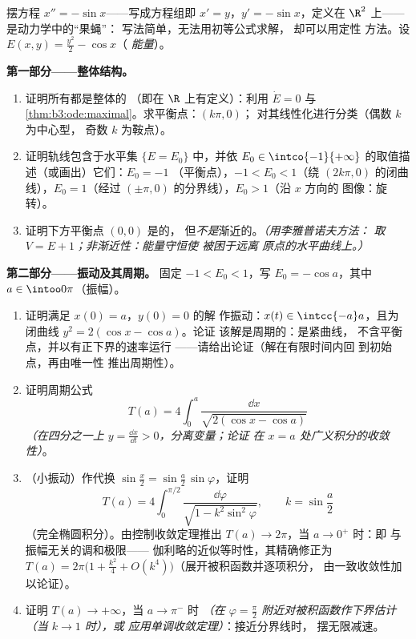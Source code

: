 \begin{problem}\label{pb:b3:ode:1}
摆方程 $x'' = -\sin x$——写成方程组即 $x' =
y$，$y' = -\sin x$，定义在 $\R^2$ 上——是动力学中的“果蝇”：
写法简单，无法用初等公式求解，
却可以用定性
方法。设 $E(x, y) = \frac{y^2}2 - \cos x$（
\emph{能量}）。

\medskip
\noindent\textbf{第一部分——整体结构。}
\begin{enumerate}
  \item 证明所有都是整体的
        （即在 $\R$ 上有定义）：利用 $\dot E = 0$ 与
        \cref{thm:b3:ode:maximal}。求平衡点：$(k\pi, 0)$；
        对其线性化进行分类（偶数 $k$ 为中心型，
        奇数 $k$ 为鞍点）。
  \item 证明轨线包含于水平集
        $\{E = E_0\}$ 中，并依
        $E_0 \in \intco{-1}{+\infty}$ 的取值描述（或画出）它们：$E_0 = -1$
        （平衡点），$-1 < E_0 < 1$（绕
        $(2k\pi, 0)$ 的闭曲线），$E_0 = 1$（经过
        $(\pm\pi, 0)$ 的分界线），$E_0 > 1$（沿 $x$ 方向的
        图像：旋转）。
  \item 证明下方平衡点 $(0,0)$ 是的，
        但\emph{不是}渐近的。\emph{（用李雅普诺夫方法：
        取 $V = E + 1$；非渐近性：能量守恒使
        被困于远离
        原点的水平曲线上。）}
\end{enumerate}

\medskip
\noindent\textbf{第二部分——振动及其周期。}
固定 $-1 < E_0 < 1$，写 $E_0 = -\cos a$，其中 $a \in
\intoo0\pi$（振幅）。
\begin{enumerate}[resume]
  \item 证明满足 $x(0) = a$，$y(0) = 0$ 的解
        作振动：$x(t) \in \intcc{-a}a$，且为
        闭曲线 $y^2 = 2(\cos x - \cos a)$。论证
        该解是周期的：是紧曲线，
        不含平衡点，并以有正下界的速率运行
        ——请给出论证（解在有限时间内回
        到初始点，再由唯一性
        推出周期性）。
  \item 证明周期公式
        \[
        T(a) = 4\int_0^{a}\frac{\dd x}{\sqrt{2(\cos x -
        \cos a)}}
        \]
        \emph{（在四分之一上 $y = \frac{\dd x}{\dd t} >
        0$，分离变量；论证
        在 $x = a$ 处广义积分的收敛性）}。
  \item （小振动）作代换 $\sin\frac x2 =
        \sin\frac a2\,\sin\varphi$，证明
        \[
        T(a) = 4\int_0^{\pi/2}\frac{\dd\varphi}{\sqrt{1 -
        k^2\sin^2\varphi}},
        \qquad k = \sin\frac a2
        \]
        （完全椭圆积分）。由控制收敛定理推出
        $T(a) \to 2\pi$，当 $a \to 0^+$ 时：即
        与振幅无关的调和极限——
        伽利略的近似等时性，其精确修正为
        $T(a) = 2\pi\bigl(1 + \frac{k^2}4 +
        O(k^4)\bigr)$（展开被积函数并逐项积分，
        由一致收敛性加以论证）。
  \item 证明 $T(a) \to +\infty$，当 $a \to \pi^-$ 时
        \emph{（在 $\varphi =
        \frac\pi2$ 附近对被积函数作下界估计（当 $k \to 1$ 时），或
        应用单调收敛定理）}：接近分界线时，
        摆无限减速。
\end{enumerate}


\end{problem}
